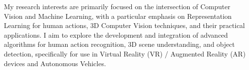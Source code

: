 


\begin{cventries}

\cvtext
{ %
\begin{cvitems}
My research interests are primarily focused on the intersection of Computer Vision and Machine Learning, with a particular emphasis on Representation Learning for human actions, 3D Computer Vision techniques, and their practical applications. 
I aim to explore the development and integration of advanced algorithms for human action recognition, 3D scene understanding, and object detection, specifically for use in Virtual Reality (VR) / Augmented Reality (AR) devices and Autonomous Vehicles.
\end{cvitems}
}


\end{cventries}
